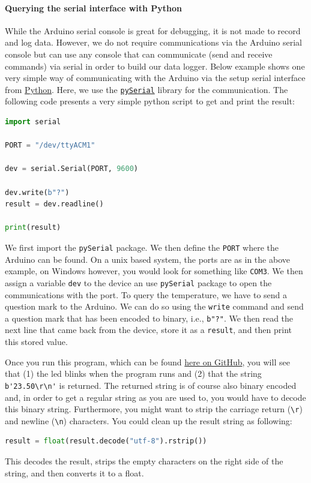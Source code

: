 \paragraph{Querying the serial interface with Python}
While the Arduino serial console is great for debugging, it is not made to record and log data. However, we do not require communications via the Arduino serial console but can use any console that can communicate (send and receive commands) via serial in order to build our data logger. Below example shows one very simple way of communicating with the Arduino via the setup serial interface from \href{https://www.python.org/}{Python}. Here, we use the \href{https://pyserial.readthedocs.io/en/latest/pyserial.html}{\texttt{pySerial}} library for the communication. The following code presents a very simple python script to get and print the result:
\begin{lstlisting}[language=python]
import serial

PORT = "/dev/ttyACM1"

dev = serial.Serial(PORT, 9600)

dev.write(b"?")
result = dev.readline()

print(result)
\end{lstlisting}
We first import the \lstinline{pySerial} package. We then define the \lstinline{PORT} where the Arduino can be found. On a unix based system, the ports are as in the above example, on Windows however, you would look for something like \lstinline{COM3}. We then assign a variable \lstinline{dev} to the device an use \lstinline{pySerial} package to open the communications with the port. To query the temperature, we have to send a question mark to the Arduino. We can do so using the \lstinline{write} command and send a question mark that has been encoded to binary, i.e., \lstinline{b"?"}. We then read the next line that came back from the device, store it as a \lstinline{result}, and then print this stored value.

Once you run this program, which can be found \href{https://github.com/galactic-forensics/workshop_arduino_electronics/blob/main/further_examples/data_logger/simple_query.py}{here on GitHub}, you will see that (1) the \ac{led} blinks when the program runs and (2) that the string \lstinline{b'23.50\r\n'} is returned. The returned string is of course also binary encoded and, in order to get a regular string as you are used to, you would have to decode this binary string. Furthermore, you might want to strip the carriage return (\lstinline{\r}) and newline (\lstinline{\n}) characters. You could clean up the result string as following:
\begin{lstlisting}[language=python]
result = float(result.decode("utf-8").rstrip())
\end{lstlisting}
This decodes the result, strips the empty characters on the right side of the string, and then converts it to a float. 

